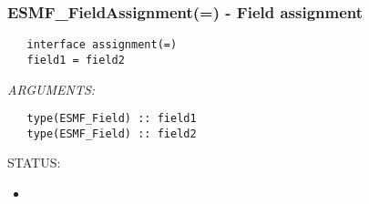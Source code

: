  
\setlength{\oldparskip}{\parskip}
\setlength{\parskip}{1.5ex}
\setlength{\oldparindent}{\parindent}
\setlength{\parindent}{0pt}
\setlength{\oldbaselineskip}{\baselineskip}
\setlength{\baselineskip}{11pt}
 
\def\bv{\begin{verbatim}}
\def\ev{\end{verbatim}}
\def\be{\begin{equation}}
\def\ee{\end{equation}}
\def\bea{\begin{eqnarray}}
\def\eea{\end{eqnarray}}
\def\bi{\begin{itemize}}
\def\ei{\end{itemize}}
\def\bn{\begin{enumerate}}
\def\en{\end{enumerate}}
\def\bd{\begin{description}}
\def\ed{\end{description}}
\def\({\left (}
\def\){\right )}
\def\[{\left [}
\def\]{\right ]}
\def\<{\left  \langle}
\def\>{\right \rangle}
\def\cI{{\cal I}}
\def\diag{\mathop{\rm diag}}
\def\tr{\mathop{\rm tr}}


 
\subsubsection [ESMF\_FieldAssignment(=)] {ESMF\_FieldAssignment(=) - Field assignment}


  
\begin{verbatim}   interface assignment(=)
   field1 = field2\end{verbatim}{\em ARGUMENTS:}
\begin{verbatim}   type(ESMF_Field) :: field1
   type(ESMF_Field) :: field2\end{verbatim}
{\sf STATUS:}
   \begin{itemize}
   \item{}
   \end{itemize}
  
